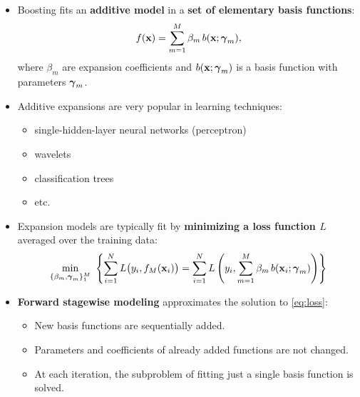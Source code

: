   \begin{itemize}
    \item Boosting fits an \textbf{additive model} in a \textbf{set of elementary basis functions}:
      \begin{displaymath}
        f(\bm{\mathrm{x}})=\sum_{m=1}^{M} \beta_m\, b(\bm{\mathrm{x}};\bm{\mathrm{\gamma}}_m),
      \end{displaymath}
      where $\beta_m$ are expansion coefficients and $b(\bm{\mathrm{x}};\bm{\mathrm{\gamma}}_m)$ is a basis function with parameters $\bm{\mathrm{\gamma}}_m$.
    \item Additive expansions are very popular in learning techniques:
      \begin{itemize}
        \item single-hidden-layer neural networks (perceptron)
        \item wavelets
        \item classification trees
        \item etc.
      \end{itemize}
  \end{itemize}
  
  \begin{itemize}
    \item Expansion models are typically fit by \textbf{minimizing a loss function $L$} averaged over the training data:
      \begin{equation} 
        \label{eq:loss}
        \min_{\{ \beta_m, \bm{\mathrm{\gamma}}_m \}_1^M } ~ 
        \left\{
          \sum_{i=1}^N L \big( y_i, f_M(\bm{\mathrm{x}}_i) \big) =
          \sum_{i=1}^N L \left( y_i, \sum_{m=1}^M \beta_m \, b(\bm{\mathrm{x}}_i ; \bm{\mathrm{\gamma}}_m) \right)
        \right\}
      \end{equation}
                           
    \item\textbf  {Forward stagewise modeling} approximates the solution to \eqref{eq:loss}:
      \begin{itemize}
        \item New basis functions are sequentially added.          
        \item Parameters and coefficients of already added functions are not changed.
        \item At each iteration, the subproblem of fitting just a single basis function is solved.
      \end{itemize}
  \end{itemize}
          
